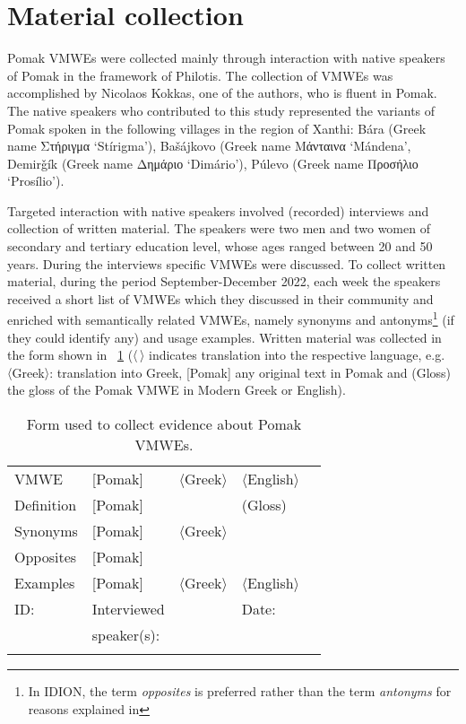 \documentclass[output=paper,colorlinks,citecolor=brown]{langscibook}
\begin{document}
\section{Material collection}
\label{sec:oralmaterial}

Pomak VMWEs were collected mainly through interaction with native speakers of Pomak in the framework of Philotis. The collection of VMWEs was accomplished by Nicolaos Kokkas, one of the authors, who is fluent in Pomak.   The native speakers who contributed to this study represented the variants of Pomak spoken in the following villages in the region of Xanthi:   Bára (Greek name Στήριγμα `Stírigma'), Bašájkovo (Greek name Μάνταινα `Mándena', Demirǧík (Greek name Δημάριο `Dimário'), Púlevo  (Greek name Προσήλιο `Prosílio').

Targeted interaction with native speakers involved  (recorded) interviews and collection of written material. The speakers were two men and two women of secondary and tertiary education level, whose ages ranged between 20 and 50 years. During the interviews specific VMWEs were discussed. To collect written material, during the period September-December 2022,  each week the speakers received a short list of VMWEs which they discussed in their community and enriched with semantically related VMWEs, namely synonyms and antonyms\footnote{In IDION, the term \textit{opposites} is preferred rather than the term \textit{antonyms} for reasons explained in } (if they could identify any) and usage examples. Written material was collected in the form shown in \tablename~\ref{tab:form}  (〈\,〉 indicates translation into the respective language, e.g. 〈Greek〉: translation into Greek,  [Pomak]  any original text in Pomak and (Gloss) the gloss of the Pomak VMWE in Modern Greek or English). 

\begin{table}
\begin{tabular}{lllll}
\lsptoprule
VMWE       & [Pomak] & 〈Greek〉 & 〈English〉  \\ 
Definition & [Pomak] &        & (Gloss)  \\
Synonyms   & [Pomak] & 〈Greek〉 &  \\
Opposites  & [Pomak] &        &  \\ 
Examples   & [Pomak] & 〈Greek〉 & 〈English〉 \\ 
\midrule
ID: & Interviewed    &        & Date:  \\
    & speaker(s):    &        &   \\
\lspbottomrule
\end{tabular}
\caption{Form used to collect evidence about Pomak VMWEs.\label{tab:form}}
\end{table}
\end{document}
